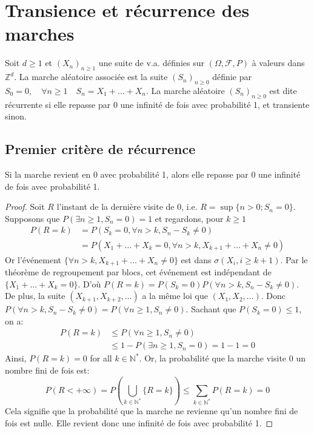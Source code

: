 \chapter{Transience et récurrence des marches}
\sloppy


Soit $d \ge 1$ et $(X_n)_{n \ge 1}$ une suite de v.a. définies sur $(\Omega, \mathcal{F}, P)$ à valeurs dans $\mathbb{Z}^d$. La marche aléatoire associée est la suite $(S_n)_{n \ge 0}$ définie par $S_0=0, \quad \forall n \ge 1 \quad S_n=X_1+\dots+X_n$.
La marche aléatoire $(S_n)_{n \ge 0}$ est dite récurrente si elle repasse par 0 une infinité de fois avec probabilité 1, et transiente sinon.
\section{Premier critère de récurrence}
\begin{proposition}
Si la marche revient en 0 avec probabilité 1, alors elle repasse par 0 une infinité de fois avec probabilité 1.
\end{proposition}
\begin{proof}
Soit $R$ l'instant de la dernière visite de 0, i.e. $R = \sup\{n > 0; S_n = 0\}$.
Supposons que $P(\exists n \ge 1, S_n=0) = 1$ et regardons, pour $k \ge 1$
\begin{align*}
    P(R=k) &= P(S_k=0, \forall n>k, S_n-S_k \neq 0) \\
    &= P(X_1+\dots+X_k = 0, \forall n>k, X_{k+1}+\dots+X_n \neq 0)
\end{align*}
Or l'événement $\{\forall n>k, X_{k+1}+\dots+X_n \neq 0\}$ est dans $\sigma(X_i, i \ge k+1)$.
Par le théorème de regroupement par blocs, cet événement est indépendant de $\{X_1+\dots+X_k=0\}$.
D'où $P(R=k) = P(S_k=0) P(\forall n>k, S_n-S_k \neq 0)$.
De plus, la suite $(X_{k+1}, X_{k+2}, \dots)$ a la même loi que $(X_1, X_2, \dots)$.
Donc $P(\forall n>k, S_n-S_k \neq 0) = P(\forall n \ge 1, S_n \neq 0)$.
Sachant que $P(S_k=0) \le 1$, on a:
\begin{align*}
    P(R=k) &\le P(\forall n \ge 1, S_n \neq 0) \\
    &\le 1 - P(\exists n \ge 1, S_n = 0) = 1-1=0
\end{align*}
Ainsi, $P(R=k)=0$ for all $k \in \mathbb{N}^*$.
Or, la probabilité que la marche visite 0 un nombre fini de fois est:
\begin{equation*}
    P(R < +\infty) = P(\bigcup_{k \in \mathbb{N}^*} \{R=k\}) \le \sum_{k \in \mathbb{N}^*} P(R=k) = 0
\end{equation*}
Cela signifie que la probabilité que la marche ne revienne qu'un nombre fini de fois est nulle. Elle revient donc une infinité de fois avec probabilité 1.
\end{proof}
